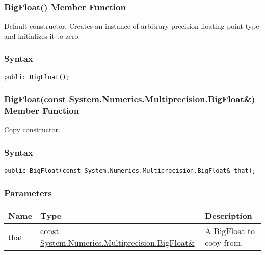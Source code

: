 \documentclass[a4paper,oneside,11.000000pt]{book}
\begin{document}
\hypertarget{System.Numerics.Multiprecision.BigFloat.constructor.P.System.Numerics.Multiprecision.BigFloat}{\subsubsection*{BigFloat() Member Function}}
\begin{flushleft}
Default constructor. Creates an instance of arbitrary precision floating point type and initializes it to zero.

\end{flushleft}
\subsubsection*{Syntax}\texttt{public BigFloat();}
\clearpage

\hypertarget{System.Numerics.Multiprecision.BigFloat.constructor.P.System.Numerics.Multiprecision.BigFloat.C.R.System.Numerics.Multiprecision.BigFloat}{\subsubsection*{BigFloat(const System.Numerics.Multiprecision.BigFloat\&) Member Function}}\begin{flushleft}
Copy constructor.

\end{flushleft}
\subsubsection*{Syntax}
\texttt{public BigFloat(const System.Numerics.Multiprecision.BigFloat\& that);}
\subsubsection*{Parameters}
\begin{flushleft}
\begin{supertabular}[l]{!{\raggedright}p{1.30721cm}!{\raggedright}p{8.55945cm}!{\raggedright}p{4.93333cm}}
\textbf{Name}
& \textbf{Type}
& \textbf{Description}
\\
\hline
that
& \hyperlink{System.Numerics.Multiprecision.BigFloat}{const System.\-Numerics.\-Multiprecision.\-BigFloat\&\-}
& A \hyperlink{System.Numerics.Multiprecision.BigFloat}{BigFloat} to copy from.

\\
\end{supertabular}

\end{flushleft}
\clearpage
\end{document}
